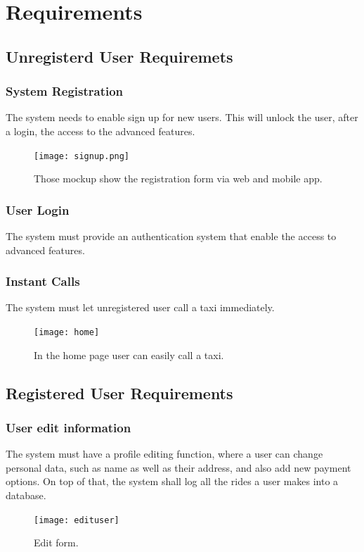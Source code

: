 \section{Requirements}
	\subsection {Unregisterd User Requiremets}
		\subsubsection {System Registration}
			The system needs to enable sign up for new users. This will unlock the user, after a login, the access to the advanced features.
			\begin{figure}[h]
				\texttt{[image: signup.png]}
				\caption{Those mockup show the registration form via web and mobile app.}
			\end{figure}
			\newpage
		\subsubsection {User Login}
		 	The system must provide an authentication system that enable the access to advanced features.
		\subsubsection {Instant Calls}
			The system must let unregistered user call a taxi immediately.
			\begin{figure}[h!]
				\texttt{[image: home]}
				\caption{In the home page user can easily call a taxi.}
			\end{figure}
			\newpage
	\subsection {Registered User Requirements}
		\subsubsection {User edit information}
			The system must have a profile editing function, where a user can change personal data, such as name as well as their address,
			and also add new payment options. On top of that, the system shall log all the rides a user makes into a database.
			\begin{figure}[h!]
				\texttt{[image: edituser]}
				\caption{Edit form.}
			\end{figure}
			\newpage
